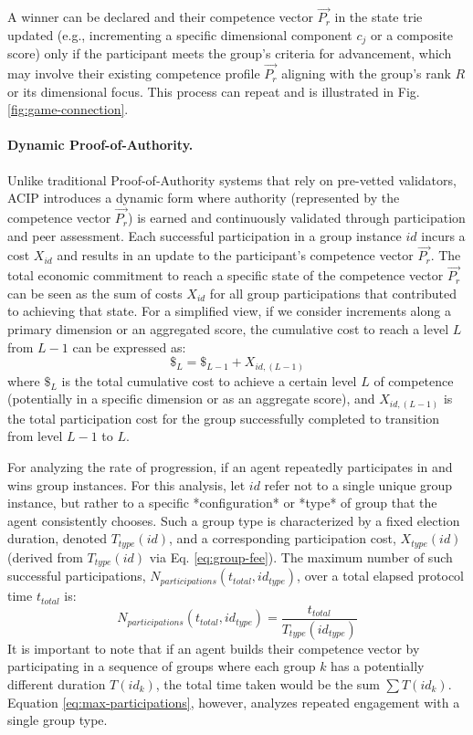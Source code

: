 \documentclass{article}
\begin{document}
\begin{CJK}{UTF8}{gbsn}
    A winner can be declared and their competence vector $\vec{P_r}$ in the state trie updated (e.g., incrementing a specific dimensional component $c_j$ or a composite score) only if the participant meets the group's criteria for advancement, which may involve their existing competence profile $\vec{P_r}$ aligning with the group's rank $R$ or its dimensional focus. This process can repeat and is illustrated in Fig. \ref*{fig:game-connection}.

    \paragraph{Dynamic Proof-of-Authority.} Unlike traditional Proof-of-Authority systems that rely on pre-vetted validators, ACIP introduces a dynamic form where authority (represented by the competence vector $\vec{P_r}$) is earned and continuously validated through participation and peer assessment. Each successful participation in a group instance $id$ incurs a cost $X_{id}$ and results in an update to the participant's competence vector $\vec{P_r}$. The total economic commitment to reach a specific state of the competence vector $\vec{P_r}$ can be seen as the sum of costs $X_{id}$ for all group participations that contributed to achieving that state. For a simplified view, if we consider increments along a primary dimension or an aggregated score, the cumulative cost to reach a level $L$ from $L-1$ can be expressed as:
    \begin{equation}
        \label{eq:time-weighted-proof-of-authority}
        \$_{L} = \$_{L-1} + X_{id, (L-1)}
    \end{equation}
    where $\$_{L}$ is the total cumulative cost to achieve a certain level $L$ of competence (potentially in a specific dimension or as an aggregate score), and $X_{id, (L-1)}$ is the total participation cost for the group successfully completed to transition from level $L-1$ to $L$.

        For analyzing the rate of progression, if an agent repeatedly participates in and wins group instances. For this analysis, let $id$ refer not to a single unique group instance, but rather to a specific *configuration* or *type* of group that the agent consistently chooses. Such a group type is characterized by a fixed election duration, denoted $T_{type}(id)$, and a corresponding participation cost, $X_{type}(id)$ (derived from $T_{type}(id)$ via Eq. \ref{eq:group-fee}). The maximum number of such successful participations, $N_{participations}(t_{total}, id_{type})$, over a total elapsed protocol time $t_{total}$ is:
        \begin{equation}
            \label{eq:max-participations} %
            N_{participations}(t_{total}, id_{type}) = \dfrac{t_{total}}{T_{type}(id_{type})}
        \end{equation}
        It is important to note that if an agent builds their competence vector by participating in a sequence of groups where each group $k$ has a potentially different duration $T(id_k)$, the total time taken would be the sum $\sum T(id_k)$. Equation \ref{eq:max-participations}, however, analyzes repeated engagement with a single group type.


\end{CJK}
\end{document}
